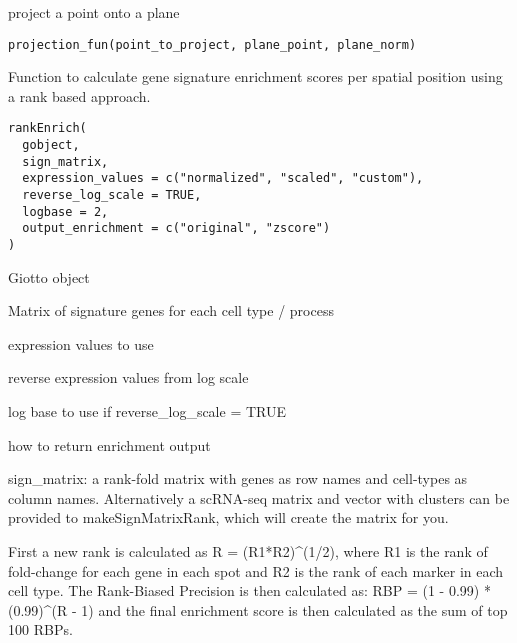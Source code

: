 \documentclass[a4paper]{book}
\begin{document}
%
\begin{Description}\relax
project a point onto a plane
\end{Description}
%
\begin{Usage}
\begin{verbatim}
projection_fun(point_to_project, plane_point, plane_norm)
\end{verbatim}
\end{Usage}
%
\begin{Description}\relax
Function to calculate gene signature enrichment scores per spatial position using a rank based approach.
\end{Description}
%
\begin{Usage}
\begin{verbatim}
rankEnrich(
  gobject,
  sign_matrix,
  expression_values = c("normalized", "scaled", "custom"),
  reverse_log_scale = TRUE,
  logbase = 2,
  output_enrichment = c("original", "zscore")
)
\end{verbatim}
\end{Usage}
%
\begin{Arguments}
\begin{ldescription}
\item[\code{gobject}] Giotto object

\item[\code{sign\_matrix}] Matrix of signature genes for each cell type / process

\item[\code{expression\_values}] expression values to use

\item[\code{reverse\_log\_scale}] reverse expression values from log scale

\item[\code{logbase}] log base to use if reverse\_log\_scale = TRUE

\item[\code{output\_enrichment}] how to return enrichment output
\end{ldescription}
\end{Arguments}
%
\begin{Details}\relax
sign\_matrix: a rank-fold matrix with genes as row names and cell-types as column names.
Alternatively a scRNA-seq matrix and vector with clusters can be provided to makeSignMatrixRank, which will create
the matrix for you. \\{}

First a new rank is calculated as R = (R1*R2)\textasciicircum{}(1/2), where R1 is the rank of
fold-change for each gene in each spot and R2 is the rank of each marker in each cell type.
The Rank-Biased Precision is then calculated as: RBP = (1 - 0.99) * (0.99)\textasciicircum{}(R - 1)
and the final enrichment score is then calculated as the sum of top 100 RBPs.
\end{Details}
\end{document}
